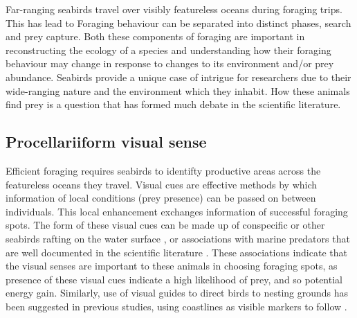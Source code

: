 \documentclass[9pt,twocolumn,twoside,lineno]{pnas-new}
\begin{document}
Far-ranging seabirds travel over visibly featureless oceans during foraging trips. This has lead to 
Foraging behaviour can be separated into distinct phases, search and prey capture. Both these components of foraging are important in reconstructing the ecology of a species and understanding how their foraging behaviour may change in response to changes to its environment and/or prey abundance. Seabirds provide a unique case of intrigue for researchers due to their wide-ranging nature and the environment which they inhabit. How these animals find prey is a question that has formed much debate in the scientific literature.

\subsection{Procellariiform visual sense}
Efficient foraging requires seabirds to identifty productive areas across the featureless oceans they travel. Visual cues are effective methods by which information of local conditions (prey presence) can be passed on between individuals. This local enhancement exchanges information of successful foraging spots. The form of these visual cues can be made up of conspecific or other seabirds rafting on the water surface \citep{Weimerskirch_2010b}, or associations with marine predators that are well documented in the scientific literature \citep{Nevitt_1999, Sakamoto_2009a, Silverman_2004, Thiebot_2012}. These associations indicate that the visual senses are important to these animals in choosing foraging spots, as presence of these visual cues indicate a high likelihood of prey, and so potential energy gain. Similarly, use of visual guides to direct birds to nesting grounds has been suggested in previous studies, using coastlines as visible markers to follow \citep{Pollonara_2015,Yamamoto_2008}.

\end{document}
